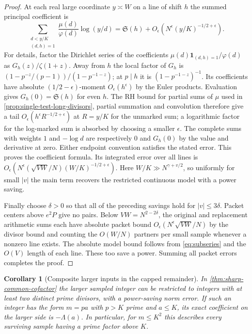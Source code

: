 \documentclass[11pt,a4paper]{article}
\numberwithin{equation}{section}
\newtheorem{corollary}[theorem]{Corollary}
\newcommand{\SSS}{\mathfrak S}
\begin{document}
\begin{proof}
At each real large coordinate $y\asymp W$ on a line of shift
$h$ the summed principal coefficient is
\[
 \sum_{\substack{d<y/K\\(d,h)=1}}
           \frac{\mu(d)}{\varphi(d)}\log(y/d)
       =\SSS(h)+O_\epsilon(N^\epsilon (y/K)^{-1/2+\epsilon}).
\]
For details, factor the Dirichlet series of the coefficients
$\mu(d)\mathbf1_{(d,h)=1}/\varphi(d)$ as
$G_h(z)/\zeta(1+z)$. Away from $h$ the local factor of $G_h$
is $(1-p^{-z}/(p-1))/(1-p^{-1-z})$; at $p\mid h$ it is
$(1-p^{-1-z})^{-1}$. Its coefficients have absolute
$(1/2-\epsilon)$-moment $O_\epsilon(h^\epsilon)$ by the
Euler products. Evaluation gives $G_h(0)=\SSS(h)$ for even
$h$. The RH bound for partial sums of $\mu$ used in
\cref{prop:single-test-long-divisors}, partial summation and
convolution therefore give a tail $O_\epsilon(h^\epsilon
R^{-1/2+\epsilon})$ at $R=y/K$ for the unmarked sum; a
logarithmic factor for the log-marked sum is absorbed by
choosing a smaller $\epsilon$. The complete sums with weights
$1$ and $-\log d$ are respectively $0$ and $G_h(0)$ by the
value and derivative at zero. Either endpoint convention
satisfies the stated error. This proves the coefficient formula.
Its integrated error over all lines is
$O_\epsilon(N^\epsilon(\sqrt{VW}/N)(W/K)^{-1/2+\epsilon})$.
Here $W/K\gg N^{\gamma+v/2}$, so uniformly for small $|v|$
the main term recovers the restricted continuous model with
a power saving.

Finally choose $\delta>0$ so that all of the preceding savings
hold for $|v|\le 3\delta$. Packet centers above $e^2P$ give
no pairs. Below $VW=N^{2-2\delta}$, the original and replacement
arithmetic sums each have absolute packet bound
$O_\epsilon(N^\epsilon\sqrt{VW}/N)$ by the divisor bound and
counting the $O(W/N)$ partners per small sample whenever a
nonzero line exists. The absolute model bound follows from
\eqref{eq:subseries} and the $O(V)$ length of each line.
These too save a power. Summing all packet errors completes
the proof.
\end{proof}

\begin{corollary}[Composite larger inputs in the capped remainder]
\label{cor:critical-composite-cofactor}
In \cref{thm:sharp-common-cofactor} the larger sampled integer
can be restricted to integers with at least two distinct prime
divisors, with a power-saving norm error. If such an integer
has the form $m=pa$ with $p>K$ prime and $a\le K$, its exact
coefficient on the larger side is $-\Lambda(a)$. In particular,
for $m\le K^2$ this describes every surviving sample having a
prime factor above $K$.
\end{corollary}
\end{document}
